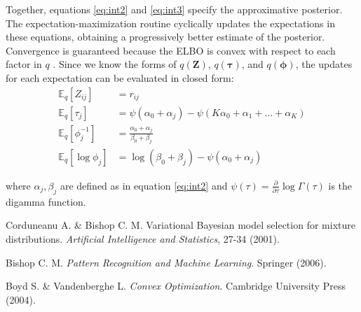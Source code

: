 \documentclass{article}
\let\vec\boldsymbol
\begin{document}
Together, equations \ref{eq:int2} and \ref{eq:int3} specify the approximative posterior. The expectation-maximization routine cyclically updates the expectations in these equations, obtaining a progressively better estimate of the posterior. Convergence is guaranteed because the ELBO is convex with respect to each factor in $q$ \cite{boyd2004}. Since we know the forms of $q(\vec{Z})$, $q(\boldsymbol{\tau})$, and $q(\boldsymbol{\phi})$, the updates for each expectation can be evaluated in closed form:
\begin{align*}
    \mathbb{E}_{q} \left[ Z_{ij} \right] &= r_{ij} \\
    \mathbb{E}_{q} \left[ \tau_{j} \right] &= \psi \left( \alpha_{0} + \alpha_{j} \right) - \psi \left( K \alpha_{0} + \alpha_{1} + ... + \alpha_{K} \right) \\
    \mathbb{E}_{q} \left[ \phi_{j}^{-1} \right] &= \frac{\alpha_{0} + \alpha_{j}}{\beta_{0} + \beta_{j}} \\
    \mathbb{E}_{q} \left[ \log \phi_{j} \right] &= \log (\beta_{0} + \beta_{j}) - \psi ( \alpha_{0} + \alpha_{j} )
\end{align*}

where $\alpha_{j}, \beta_{j}$ are defined as in equation \ref{eq:int2} and
$\psi(\tau) = \frac{\partial}{\partial \tau} \log \Gamma (\tau)$ is the
digamma function.

\begin{thebibliography}{9}

Corduneanu A. \& Bishop C. M. Variational Bayesian model selection for mixture distributions. \emph{Artificial Intelligence and Statistics}, 27-34 (2001).

Bishop C. M. \emph{Pattern Recognition and Machine Learning}. Springer (2006).

Boyd S. \& Vandenberghe L. \emph{Convex Optimization}. Cambridge University Press (2004).

\end{thebibliography}
\end{document}
